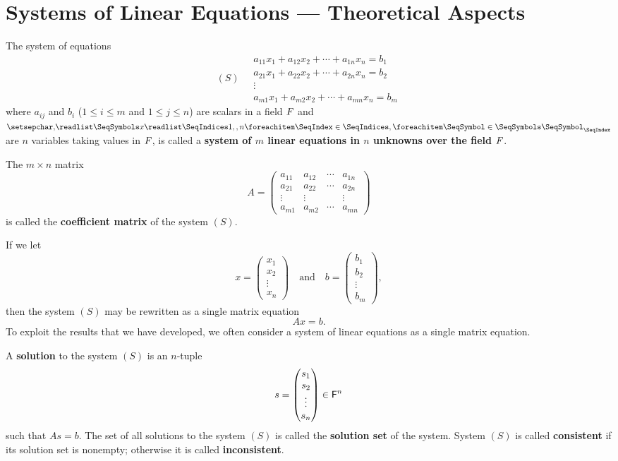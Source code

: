 \section{Systems of Linear Equations --- Theoretical Aspects}\label{sec:3.3}

\begin{defn}\label{3.3.1}
	The system of equations
	\[
		(S) \quad \begin{matrix}
			a_{1 1} x_1 + a_{1 2} x_2 + \cdots + a_{1 n} x_n = b_1 \\
			a_{2 1} x_1 + a_{2 2} x_2 + \cdots + a_{2 n} x_n = b_2 \\
			\vdots                                                 \\
			a_{m 1} x_1 + a_{m 2} x_2 + \cdots + a_{m n} x_n = b_m
		\end{matrix}
	\]
	where \(a_{i j}\) and \(b_i\) (\(1 \leq i \leq m\) and \(1 \leq j \leq n\)) are scalars in a field \(\mathit{F}\) and \(\seq{x}{1,,n}\) are \(n\) variables taking values in \(\mathit{F}\), is called a \textbf{system of \(m\) linear equations in \(n\) unknowns over the field \(\mathit{F}\)}.

	The \(m \times n\) matrix
	\[
		A = \begin{pmatrix}
			a_{1 1} & a_{1 2} & \cdots & a_{1 n} \\
			a_{2 1} & a_{2 2} & \cdots & a_{2 n} \\
			\vdots  & \vdots  &        & \vdots  \\
			a_{m 1} & a_{m 2} & \cdots & a_{m n}
		\end{pmatrix}
	\]
	is called the \textbf{coefficient matrix} of the system \((S)\).

	If we let
	\[
		x = \begin{pmatrix}
			x_1    \\
			x_2    \\
			\vdots \\
			x_n
		\end{pmatrix} \quad \text{and} \quad b = \begin{pmatrix}
			b_1    \\
			b_2    \\
			\vdots \\
			b_m
		\end{pmatrix},
	\]
	then the system \((S)\) may be rewritten as a single matrix equation
	\[
		Ax = b.
	\]
	To exploit the results that we have developed, we often consider a system of linear equations as a single matrix equation.

	A \textbf{solution} to the system \((S)\) is an \(n\)-tuple
	\[
		s = \begin{pmatrix}
			s_1    \\
			s_2    \\
			\vdots \\
			s_n
		\end{pmatrix} \in \mathsf{F}^n
	\]
	such that \(As = b\).
	The set of all solutions to the system \((S)\) is called the \textbf{solution set} of the system.
	System \((S)\) is called \textbf{consistent} if its solution set is nonempty;
	otherwise it is called \textbf{inconsistent}.
\end{defn}

